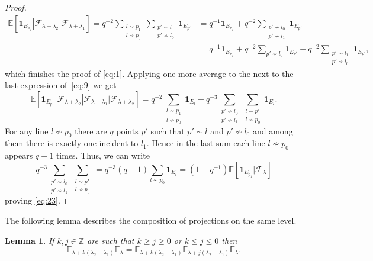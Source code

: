 \documentclass[a4paper]{amsart}
\newcommand{\ind}[1]{{\mathbf{1}_{{#1}}}}
\newcommand{\EE}{\mathbb{E}}
\newcommand{\ZZ}{\mathbb{Z}}
\renewcommand{\atop}[2]{\substack{{#1}\\{#2}}}
\theoremstyle{plain}
\newtheorem{lemma}[proposition]{Lemma}
\theoremstyle{definition}
\theoremstyle{remark}
\numberwithin{equation}{section}
\theoremstyle{plain}
\begin{document}
\begin{proof}
\begin{equation}
	\label{eq:9}
	\begin{aligned}
\EE[\ind{E_{p_1}}|\mathcal{F}_{\lambda+\lambda_2}|\mathcal{F}_{\lambda+\lambda_1}]
  = q^{-2} \sum_{\atop{l \sim p_1}{l \not\sim p_0}}
    \sum_{\atop{p' \sim l}{p' \not\sim l_0}} 
       \ind{E_{p'}}
	&=q^{-1} \ind{E_{p_1}}
     + q^{-2}\sum_{\atop{p' \not\sim l_0}{p' \not\sim l_1}} \ind{E_{p'}} \\
 & =q^{-1}\ind{E_{p_1}} + q^{-2} \sum_{p' \not\sim l_0} \ind{E_{p'}} -q^{-2}
\sum_{\atop{p' \sim l_1}{p'\not\sim l_0}} \ind{E_{p'}},
	\end{aligned}
\end{equation}
which finishes the proof of \eqref{eq:1}. Applying one more average to
the next to the last expression of~\eqref{eq:9} we get
\begin{equation*}
\EE[\ind{E_{p_1}} | \mathcal{F}_{\lambda+\lambda_2} |
  \mathcal{F}_{\lambda+\lambda_1} | \mathcal{F}_{\lambda+\lambda_2}] =
q^{-2} \sum_{\atop{l \sim p_1}{l \not\sim p_0}} \ind{E_l} + q^{-3}
\sum_{\atop{p' \not\sim l_0}{p' \not\sim l_1}} \sum_{\atop{l \sim
    p'}{l \not\sim p_0}} \ind{E_l}.
\end{equation*}
For any line $l \not\sim p_0$ there are $q$ points $p'$ such that $p'
\sim l$ and $p' \not\sim l_0$ and among them there is exactly one
incident to $l_1$. Hence in the last sum each line $l \not\sim p_0$
appears $q-1$ times. Thus, we can write
\begin{equation*}
q^{-3} \sum_{\atop{p' \not\sim l_0}{p' \not\sim l_1}} \sum_{\atop{l
    \sim p'}{l \not\sim p_0}} = q^{-3} (q-1) \sum_{l \not \sim p_0}
\ind{E_l} = (1-q^{-1}) \EE[\ind{E_{p_1}} | \mathcal{F}_\lambda]
\end{equation*}
proving \eqref{eq:23}.
\end{proof}
The following lemma describes the composition of projections on the same level.
\begin{lemma}
\label{lem:4}
If $k, j \in \ZZ$ are such that $k \geq j \geq 0$ or $k \leq j \leq 0$ then
\begin{equation}
  \label{eq:6}
  \EE_{\lambda+k(\lambda_2-\lambda_1)} \EE_\lambda =
  \EE_{\lambda+k(\lambda_2-\lambda_1)}
  \EE_{\lambda+j(\lambda_2-\lambda_1)} \EE_\lambda.
\end{equation}
\end{lemma}
\end{document}
